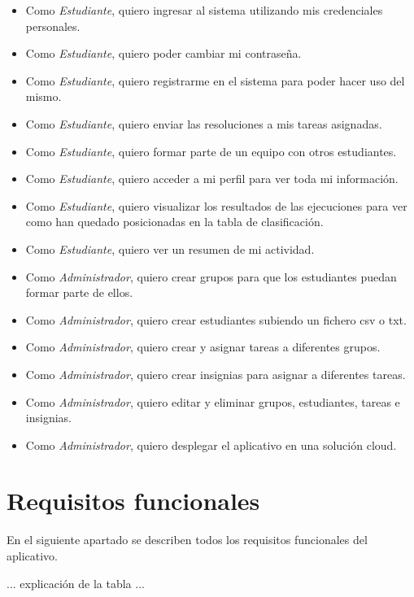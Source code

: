 \documentclass[11pt,spanish,listoffigures,listoftables]{tfgetsinf}
\begin{document}
\begin{itemize}
  \item Como \textit{Estudiante}, quiero ingresar al sistema utilizando mis credenciales personales.
  \item Como \textit{Estudiante}, quiero poder cambiar mi contraseña.
  \item Como \textit{Estudiante}, quiero registrarme en el sistema para poder hacer uso del mismo.
  \item Como \textit{Estudiante}, quiero enviar las resoluciones a mis tareas asignadas.
  \item Como \textit{Estudiante}, quiero formar parte de un equipo con otros estudiantes.
  \item Como \textit{Estudiante}, quiero acceder a mi perfil para ver toda mi información.
  \item Como \textit{Estudiante}, quiero visualizar los resultados de las ejecuciones para ver como han quedado posicionadas en la tabla de clasificación.
  \item Como \textit{Estudiante}, quiero ver un resumen de mi actividad.
  \item Como \textit{Administrador}, quiero crear grupos para que los estudiantes puedan formar parte de ellos.
  \item Como \textit{Administrador}, quiero crear estudiantes subiendo un fichero csv o txt.
  \item Como \textit{Administrador}, quiero crear y asignar tareas a diferentes grupos.
  \item Como \textit{Administrador}, quiero crear insignias para asignar a diferentes tareas.
  \item Como \textit{Administrador}, quiero editar y eliminar grupos, estudiantes, tareas e insignias.
  \item Como \textit{Administrador}, quiero desplegar el aplicativo en una solución \foreignlanguage{english}{cloud}.
\end{itemize}

\section{Requisitos funcionales}

En el siguiente apartado se describen todos los requisitos funcionales del aplicativo. \par

... explicación de la tabla ... \par
\end{document}
